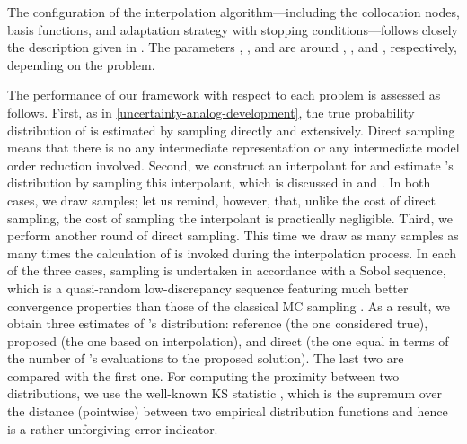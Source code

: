 The configuration of the interpolation algorithm---including the collocation
nodes, basis functions, and adaptation strategy with stopping
conditions---follows closely the description given in .
The parameters , , and  are around ,
, and , respectively, depending on the problem.

The performance of our framework with respect to each problem is assessed as
follows. First, as in \cref{uncertainty-analog-development}, the true
probability distribution of \g is estimated by sampling \g directly and
extensively. Direct sampling means that there is no any intermediate
representation or any intermediate model order reduction involved. Second, we
construct an interpolant for \g and estimate \g's distribution by sampling this
interpolant, which is discussed in  and
. In both cases, we draw  samples; let us
remind, however, that, unlike the cost of direct sampling, the cost of sampling
the interpolant is practically negligible. Third, we perform another round of
direct sampling. This time we draw as many samples as many times the calculation
of \g is invoked during the interpolation process. In each of the three cases,
sampling is undertaken in accordance with a Sobol sequence, which is a
quasi-random low-discrepancy sequence featuring much better convergence
properties than those of the classical \ac{MC} sampling \cite{joe2008}. As a
result, we obtain three estimates of \g's distribution: reference (the one
considered true), proposed (the one based on interpolation), and direct (the one
equal in terms of the number of \g's evaluations to the proposed solution). The
last two are compared with the first one. For computing the proximity between
two distributions, we use the well-known \ac{KS} statistic \cite{rao2002}, which
is the supremum over the distance (pointwise) between two empirical distribution
functions and hence is a rather unforgiving error indicator.

